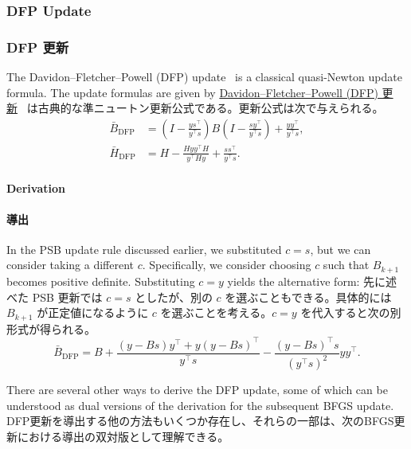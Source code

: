 \documentclass[0_main]{subfiles}
\begin{document}
\ifEn
    \subsubsection{DFP Update}
\else
    \subsubsection{DFP 更新}
\fi

\ifEn
    The Davidon--Fletcher--Powell (DFP) update~\cite{nocedal1999numerical} is a classical quasi-Newton update formula. The update formulas are given by
\else
    \href{https://en.wikipedia.org/wiki/Davidon%E2%80%93Fletcher%E2%80%93Powell_formula}{Davidon--Fletcher--Powell (DFP) 更新}~\cite{nocedal1999numerical} は古典的な準ニュートン更新公式である。更新公式は次で与えられる。
\fi
\begin{align*}
    \bar{B}_{\mathrm{DFP}} & = (I - \frac{y s^\top}{y^\top s}) B (I - \frac{s y^\top}{y^\top s}) + \frac{y y^\top}{y^\top s}, \\
    \bar{H}_{\mathrm{DFP}} & = H - \frac{H y y^\top H}{y^\top H y} + \frac{s s^\top}{y^\top s}.
\end{align*}

\ifEn
    \paragraph{Derivation}
\else
    \paragraph{導出}
\fi

\ifEn
    In the PSB update rule discussed earlier, we substituted $c=s$, but we can consider taking a different $c$. Specifically, we consider choosing $c$ such that $B_{k+1}$ becomes positive definite. Substituting $c=y$ yields the alternative form:
\else
    先に述べた PSB 更新では $c=s$ としたが、別の $c$ を選ぶこともできる。具体的には $B_{k+1}$ が正定値になるように $c$ を選ぶことを考える。$c=y$ を代入すると次の別形式が得られる。
\fi
\begin{equation*}
    \bar{B}_{\mathrm{DFP}} = B + \frac{(y - Bs)y^\top + y(y - Bs)^\top}{y^\top s} - \frac{(y - Bs)^\top s}{(y^\top s)^2} yy^\top.
\end{equation*}

\ifEn
    There are several other ways to derive the DFP update, some of which can be understood as dual versions of the derivation for the subsequent BFGS update.
\else
    DFP更新を導出する他の方法もいくつか存在し、それらの一部は、次のBFGS更新における導出の双対版として理解できる。
\fi
\end{document}
